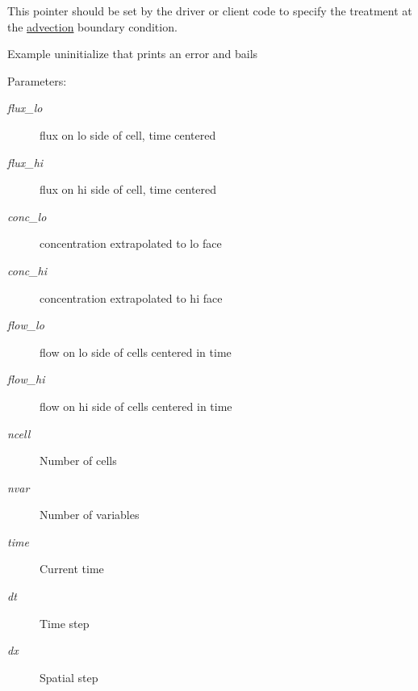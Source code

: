 This pointer should be set by the driver or client code to specify the treatment at the \hyperlink{a00052}{advection} boundary condition. 

Example uninitialize that prints an error and bails \begin{Desc}
\item[Parameters:]
\begin{description}
\item[{\em flux\_\-lo}]flux on lo side of cell, time centered\item[{\em flux\_\-hi}]flux on hi side of cell, time centered\item[{\em conc\_\-lo}]concentration extrapolated to lo face\item[{\em conc\_\-hi}]concentration extrapolated to hi face\item[{\em flow\_\-lo}]flow on lo side of cells centered in time\item[{\em flow\_\-hi}]flow on hi side of cells centered in time\item[{\em ncell}]Number of cells\item[{\em nvar}]Number of variables\item[{\em time}]Current time\item[{\em dt}]Time step \item[{\em dx}]Spatial step \end{description}
\end{Desc}
